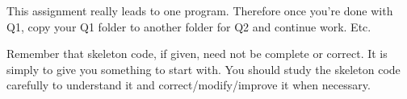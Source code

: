 
This assignment really leads to one program.
Therefore once you're done with Q1, copy your Q1 folder to another folder for
Q2 and
continue work. Etc.

Remember that skeleton code, if given, need not be complete or correct.
It is simply to give you something to start with.
You should study the skeleton code carefully to understand it
and correct/modify/improve it when necessary.
